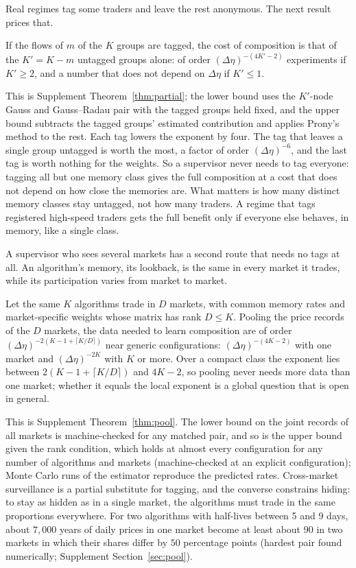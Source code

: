 Real regimes tag some traders and leave the rest anonymous. The next result prices that.

\begin{theorem}\label{n:partial}
If the flows of $m$ of the $K$ groups are tagged, the cost of composition is that of the $K'=K-m$ untagged groups alone: of order $(\Delta\eta)^{-(4K'-2)}$ experiments if $K'\ge2$, and a number that does not depend on $\Delta\eta$ if $K'\le1$.
\end{theorem}

This is Supplement Theorem~\ref{thm:partial}; the lower bound uses the $K'$-node Gauss and Gauss--Radau pair with the tagged groups held fixed, and the upper bound subtracts the tagged groups' estimated contribution and applies Prony's method to the rest. Each tag lowers the exponent by four. The tag that leaves a single group untagged is worth the most, a factor of order $(\Delta\eta)^{-6}$, and the last tag is worth nothing for the weights. So a supervisor never needs to tag everyone: tagging all but one memory class gives the full composition at a cost that does not depend on how close the memories are. What matters is how many distinct memory classes stay untagged, not how many traders. A regime that tags registered high-speed traders gets the full benefit only if everyone else behaves, in memory, like a single class.

A supervisor who sees several markets has a second route that needs no tags at all. An algorithm's memory, its lookback, is the same in every market it trades, while its participation varies from market to market.

\begin{theorem}\label{n:pool}
Let the same $K$ algorithms trade in $D$ markets, with common memory rates and market-specific weights whose matrix has rank $D\le K$. Pooling the price records of the $D$ markets, the data needed to learn composition are of order $(\Delta\eta)^{-2(K-1+\lceil K/D\rceil)}$ near generic configurations: $(\Delta\eta)^{-(4K-2)}$ with one market and $(\Delta\eta)^{-2K}$ with $K$ or more. Over a compact class the exponent lies between $2(K-1+\lceil K/D\rceil)$ and $4K-2$, so pooling never needs more data than one market; whether it equals the local exponent is a global question that is open in general.
\end{theorem}

This is Supplement Theorem~\ref{thm:pool}. The lower bound on the joint records of all markets is machine-checked for any matched pair, and so is the upper bound given the rank condition, which holds at almost every configuration for any number of algorithms and markets (machine-checked at an explicit configuration); Monte Carlo runs of the estimator reproduce the predicted rates. Cross-market surveillance is a partial substitute for tagging, and the converse constrains hiding: to stay as hidden as in a single market, the algorithms must trade in the same proportions everywhere. For two algorithms with half-lives between 5 and 9 days, about $7{,}000$ years of daily prices in one market become at least about $90$ in two markets in which their shares differ by $50$ percentage points (hardest pair found numerically; Supplement Section~\ref{sec:pool}).

